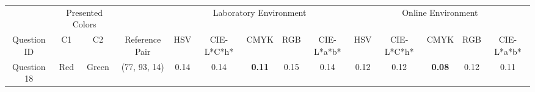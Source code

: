 \begin{table}[!htbp]
  \centering
  \resizebox{0.9\textwidth}{!} {
  \begin{tabular}{@{}cccccclccccclcccc@{}}
    \toprule
                                     & \multicolumn{2}{c}{Presented Colors}                        & \multicolumn{2}{c}{}                                                                                                  & \multicolumn{6}{c}{Laboratory Environment}                                                                                                                                                                                                                                                                     & \multicolumn{6}{c}{Online Environment}                                                                                                                                                                                                                                                                         \\ \cmidrule(lr){2-3} \cmidrule(l){6-17}
    \multirow{-2}{*}{Question ID}    & C1                           & C2                           & \multicolumn{2}{c}{\multirow{-2}{*}{Reference Pair}}                                                                  & \multicolumn{2}{c}{HSV}                                    & CIE-L*C*h*                                                 & CMYK                                                       & RGB                                                        & CIE-L*a*b*                                                 & \multicolumn{2}{c}{HSV}                                    & CIE-L*C*h*                                                 & CMYK                                                       & RGB                                                        & CIE-L*a*b*                                                 \\ \midrule
    \multicolumn{1}{c|}{Question 18} & \multicolumn{1}{c|}{Red}     & \multicolumn{1}{c|}{Green}   & \multicolumn{2}{c||}{\cellcolor[HTML]{FFFF00}(77, 93, 14)}                                                             & \multicolumn{2}{c|}{0.14}                                  & \multicolumn{1}{c|}{0.14}                                  & \multicolumn{1}{c|}{\cellcolor[HTML]{32CB00}\textbf{0.11}} & \multicolumn{1}{c|}{0.15}                                  & \multicolumn{1}{c||}{0.14}                                  & \multicolumn{2}{c|}{\cellcolor[HTML]{FFFFFF}0.12}          & \multicolumn{1}{c|}{\cellcolor[HTML]{FFFFFF}0.12}          & \multicolumn{1}{c|}{\cellcolor[HTML]{32CB00}\textbf{0.08}} & \multicolumn{1}{c|}{\cellcolor[HTML]{FFFFFF}0.12}          & \multicolumn{1}{c|}{0.11}                                  \\ \midrule

\end{tabular}}
\end{table}
